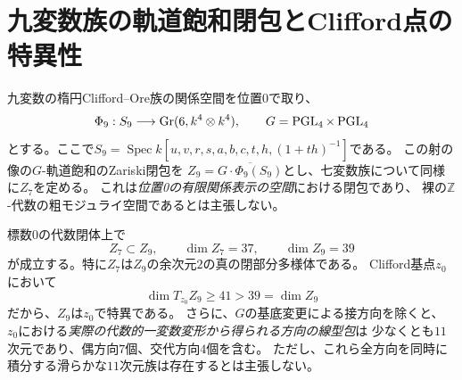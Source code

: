 \section{九変数族の軌道飽和閉包とClifford点の特異性}\label{sec:nine-closure}
九変数の楕円Clifford--Ore族の関係空間を位置$0$で取り、
\[
 \Phi_9:S_9\longrightarrow\operatorname{Gr}(6,k^4\otimes k^4),\qquad
 G=\operatorname{PGL}_4\times\operatorname{PGL}_4
\]
とする。ここで$S_9=\operatorname{Spec}k[u,v,r,s,a,b,c,t,h,(1+th)^{-1}]$である。
この射の像の$G$-軌道飽和のZariski閉包を
$Z_9=\overline{G\cdot\Phi_9(S_9)}$とし、七変数族について同様に$Z_7$を定める。
これは\emph{位置0の有限関係表示の空間}における閉包であり、
裸の$\mathbb Z$-代数の粗モジュライ空間であるとは主張しない。

\begin{theorem}[九変数族の閉包のClifford特異性]\label{thm:nine-closure-singular}
標数$0$の代数閉体上で
\[
 Z_7\subset Z_9,\qquad
 \dim Z_7=37,\qquad \dim Z_9=39
\]
が成立する。特に$Z_7$は$Z_9$の余次元$2$の真の閉部分多様体である。
Clifford基点$z_0$において
\[
 \boxed{\dim T_{z_0}Z_9\ge41>39=\dim Z_9}
\]
だから、$Z_9$は$z_0$で特異である。
さらに、$G$の基底変更による接方向を除くと、
$z_0$における\emph{実際の代数的一変数変形から得られる方向の線型包}は
少なくとも$11$次元であり、偶方向$7$個、交代方向$4$個を含む。
ただし、これら全方向を同時に積分する滑らかな$11$次元族は存在するとは主張しない。
\end{theorem}

